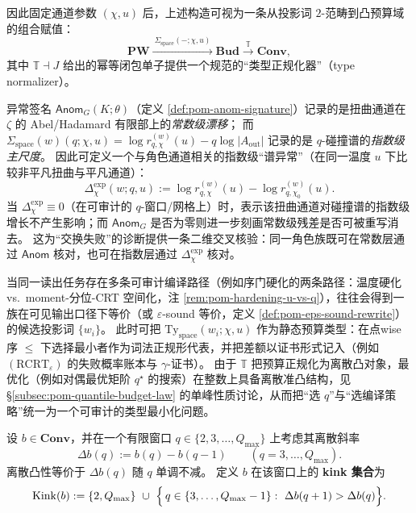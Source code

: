 因此固定通道参数 \((\chi,u)\) 后，上述构造可视为一条从投影词 $2$-范畴到凸预算域的组合赋值：
\[
\mathbf{PW}\xrightarrow{\ \Sigma_{\mathrm{space}}(-;\chi,u)\ }\mathbf{Bud}\xrightarrow{\ \mathbb{T}\ }\mathbf{Conv},
\]
其中 \(\mathbb{T}\dashv J\) 给出的幂等闭包单子提供一个规范的“类型正规化器”（type normalizer）。

\begin{remark}\label{rem:pom-constant-vs-exponential-anom}
异常签名 \(\mathsf{Anom}_G(K;\theta)\)（定义 \ref{def:pom-anom-signature}）记录的是扭曲通道在 \(\zeta\) 的 Abel/Hadamard 有限部上的\emph{常数级漂移}；
而 \(\Sigma_{\mathrm{space}}(w)(q;\chi,u)=\log r^{(w)}_{q,\chi}(u)-q\log|A_{\mathrm{out}}|\) 记录的是 \(q\)-碰撞谱的\emph{指数级主尺度}。
因此可定义一个与角色通道相关的指数级“谱异常”（在同一温度 \(u\) 下比较非平凡扭曲与平凡通道）：
\[
\Delta^{\mathrm{exp}}_{\chi}(w;q,u)
:=\log r^{(w)}_{q,\chi}(u)-\log r^{(w)}_{q,\chi_0}(u).
\]
当 \(\Delta^{\mathrm{exp}}_{\chi}\equiv 0\)（在可审计的 \(q\)-窗口/网格上）时，表示该扭曲通道对碰撞谱的指数级增长不产生影响；而 \(\mathsf{Anom}_G\) 是否为零则进一步刻画常数级残差是否可被重写消去。
这为“交换失败”的诊断提供一条二维交叉核验：同一角色族既可在常数层通过 \(\mathsf{Anom}\) 核对，也可在指数层通过 \(\Delta^{\mathrm{exp}}_{\chi}\) 核对。
\end{remark}

\begin{remark}\label{rem:pom-type-directed-normalization}
当同一读出任务存在多条可审计编译路径（例如序门硬化的两条路径：温度硬化 vs.\ moment-分位-CRT 空间化，注 \ref{rem:pom-hardening-u-vs-q}），往往会得到一族在可见输出口径下等价（或 \(\varepsilon\)-sound 等价，定义 \ref{def:pom-eps-sound-rewrite}）的候选投影词 \(\{w_i\}\)。
此时可把 \(\mathrm{Ty}_{\mathrm{space}}(w_i;\chi,u)\) 作为静态预算类型：在点wise 序 \( \le \) 下选择最小者作为词法正规形代表，并把差额以证书形式记入（例如 \((\mathrm{RCRT}_\varepsilon)\) 的失败概率账本与 \(\gamma\)-证书）。
由于 \(\mathbb{T}\) 把预算正规化为离散凸对象，最优化（例如对偶最优矩阶 \(q^\star\) 的搜索）在整数上具备离散准凸结构，见 \S\ref{subsec:pom-quantile-budget-law} 的单峰性质讨论，从而把“选 \(q\)”与“选编译策略”统一为一个可审计的类型最小化问题。
\end{remark}

\begin{definition}\label{def:pom-kink-set}
设 \(b\in\mathbf{Conv}\)，并在一个有限窗口 \(q\in\{2,3,\dots,Q_{\max}\}\) 上考虑其离散斜率
\[
\Delta b(q):=b(q)-b(q-1)\qquad(q=3,\dots,Q_{\max}).
\]
离散凸性等价于 \(\Delta b(q)\) 随 \(q\) 单调不减。
定义 \(b\) 在该窗口上的 \textbf{kink 集合}为
\[
\mathrm{Kink}(b)
:=\{2,Q_{\max}\}\ \cup\
\Bigl\{\,q\in\{3,\dots,Q_{\max}-1\}:\ \Delta b(q+1)>\Delta b(q)\Bigr\}.
\]
\end{definition}

